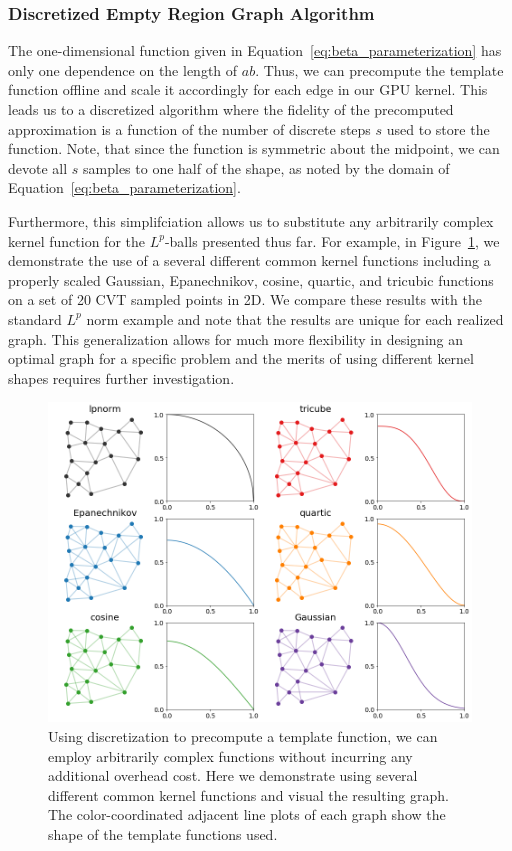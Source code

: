 \subsubsection{Discretized Empty Region Graph Algorithm}
\label{sec:gpu_bp_discrete}

The one-dimensional function given in Equation~\ref{eq:beta_parameterization} has only one dependence on the length of $ab$.
%
Thus, we can precompute the template function offline and scale it accordingly for each edge in our GPU kernel.
%
This leads us to a discretized algorithm where the fidelity of the precomputed approximation is a function of the number of discrete steps $s$ used to store the function.
%
Note, that since the function is symmetric about the midpoint, we can devote all $s$ samples to one half of the shape, as noted by the domain of Equation~\ref{eq:beta_parameterization}.

Furthermore, this simplifciation allows us to substitute any arbitrarily complex kernel function for the $L^p$-balls presented thus far.
%
For example, in Figure~\ref{fig:discrete_beta}, we demonstrate the use of a several different common kernel functions including a properly scaled Gaussian, Epanechnikov, cosine, quartic, and tricubic functions on a set of 20 CVT sampled points in 2D.
%
We compare these results with the standard $L^p$ norm example and note that the results are unique for each realized graph.
%
This generalization allows for much more flexibility in designing an optimal graph for a specific problem and the merits of using different kernel shapes requires further investigation.

\begin{figure}[htbp]
    \includegraphics[width=\linewidth]{figs/chap7/beta_shapes.png}
    \caption{Using discretization to precompute a template function, we can employ arbitrarily complex functions without incurring any additional overhead cost.
    Here we demonstrate using several different common kernel functions and visual the resulting graph.
    The color-coordinated adjacent line plots of each graph show the shape of the template functions used.}
    \label{fig:discrete_beta}
\end{figure}

